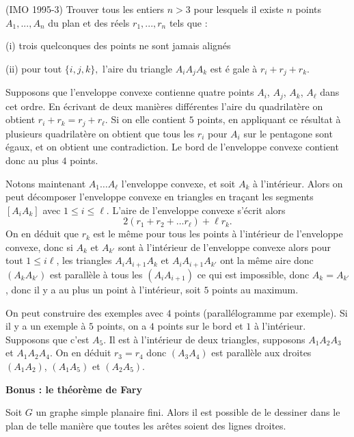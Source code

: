 \begin{exo}(IMO 1995-3)
Trouver tous les entiers $n>3$ pour lesquels il existe $n$ points $%
A_{1},...,A_{n}$ du plan et des r\'{e}els $r_{1},...,r_{n}$ tels que :

(i) trois quelconques des points ne sont jamais align\'{e}s

(ii) pour tout $\{i,j,k\},$ l'aire du triangle $A_{i}A_{j}A_{k}$ est \'{e}%
gale \`{a} $r_{i}+r_{j}+r_{k}.$
\end{exo}

\begin{sol}
Supposons que l'enveloppe convexe contienne quatre points $A_i$, $A_j$, $A_k$, $A_{\ell}$ dans cet ordre. En écrivant de deux manières différentes l'aire du quadrilatère on obtient $r_i+r_k=r_j+r_{\ell}$. Si on elle contient $5$ points, en appliquant ce résultat à plusieurs quadrilatère on obtient que tous les $r_i$ pour $A_i$ sur le pentagone sont égaux, et on obtient une contradiction. Le bord de l'enveloppe convexe contient donc au plus $4$ points.

Notons maintenant $A_1 \dots A_{\ell}$ l'enveloppe convexe, et soit $A_k$ à l'intérieur. Alors on peut décomposer l'enveloppe convexe en triangles en traçant les segments $[A_i A_k]$ avec $1 \leq i \leq \ell$. L'aire de l'enveloppe convexe s'écrit alors
\[2 (r_1+r_2+\dots r_{\ell})+ \ell r_k.\]
On en déduit que $r_k$ est le même pour tous les points à l'intérieur de l'enveloppe convexe, donc si $A_k$ et $A_{k'}$ sont à l'intérieur de l'enveloppe convexe alors pour tout $1 \leq i \ell$, les triangles $A_i A_{i+1} A_k$ et $A_i A_{i+1} A_{k'}$ ont la même aire donc $(A_k A_{k'})$ est parallèle à tous les $(A_i A_{i+1})$ ce qui est impossible, donc $A_k=A_{k'}$, donc il y a au plus un point à l'intérieur, soit $5$ points au maximum.

On peut construire des exemples avec $4$ points (parallélogramme par exemple). Si il y a un exemple à $5$ points, on a $4$ points sur le bord et $1$ à l'intérieur. Supposons que c'est $A_5$. Il est à l'intérieur de deux triangles, supposons $A_1 A_2 A_3$ et $A_1 A_2 A_4$. On en déduit $r_3=r_4$ donc $(A_3 A_4)$ est parallèle aux droites $(A_1 A_2)$, $(A_1 A_5)$ et $(A_2 A_5)$.
\end{sol}

\textbf{Bonus : le théorème de Fary}

\begin{thm}
Soit $G$ un graphe simple planaire fini. Alors il est possible de le dessiner dans le plan de telle manière que toutes les arêtes soient des lignes droites.
\end{thm}

